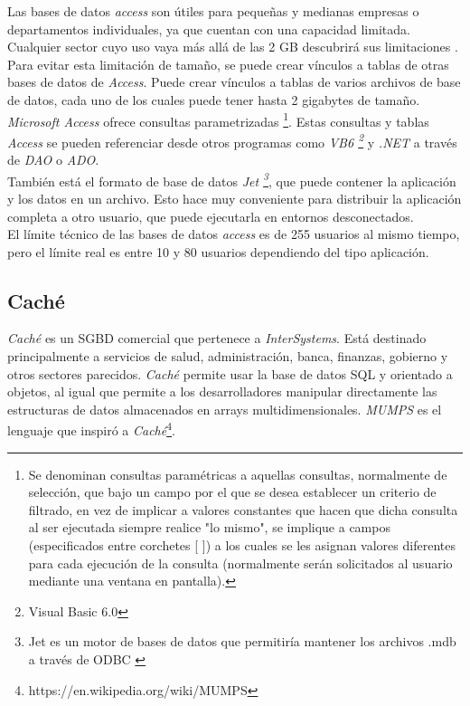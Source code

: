 \documentclass{article}
\begin{document}
Las bases de datos \emph{access} son útiles para pequeñas y medianas empresas o departamentos individuales, ya que cuentan con una capacidad limitada. Cualquier sector cuyo uso vaya más allá de las 2 GB descubrirá sus limitaciones \cite{ACC:4}. Para evitar esta limitación de tamaño, se puede crear vínculos a tablas de otras bases de datos de \emph{Access}. Puede crear vínculos a tablas de varios archivos de base de datos, cada uno de los cuales puede tener hasta 2 gigabytes de tamaño. \cite{ACC:5}\\

\emph{Microsoft Access} ofrece consultas parametrizadas \footnote{Se denominan consultas paramétricas a aquellas consultas, normalmente de selección, que bajo un campo por el que se desea establecer un criterio de filtrado, en vez de implicar a valores constantes que hacen que dicha consulta al ser ejecutada siempre realice "lo mismo", se implique a campos (especificados entre corchetes [ ]) a los cuales se les asignan valores diferentes para cada ejecución de la consulta (normalmente serán solicitados al usuario mediante una ventana en pantalla).\cite{ACC:7}}. Estas consultas y tablas \emph{Access} se pueden referenciar desde otros programas como \emph{VB6 \footnote{Visual Basic 6.0}} y \emph{.NET} a través de \emph{DAO} o \emph{ADO}. \cite{ACC:6}\\

También está el formato de base de datos \emph{Jet \footnote{Jet es un motor de bases de datos que permitiría mantener los archivos .mdb a través de ODBC \cite{ACC:8}}}, que puede contener la aplicación y los datos en un archivo. Esto hace muy conveniente para distribuir la aplicación completa a otro usuario, que puede ejecutarla en entornos desconectados. \cite{ACC:6}\\

El límite técnico de las bases de datos \emph{access} es de 255 usuarios al mismo tiempo, pero el límite real es entre 10 y 80 usuarios dependiendo del tipo aplicación. \cite{ACC:4}\\

\subsection{Caché}
\emph{Caché} es un SGBD comercial que pertenece a \emph{InterSystems}. Está destinado principalmente a servicios de salud, administración, banca, finanzas, gobierno y otros sectores parecidos. \emph{Caché} permite usar la base de datos SQL y orientado a objetos, al igual que permite a los desarrolladores manipular directamente las estructuras de datos almacenados en arrays multidimensionales. \emph{MUMPS} es el lenguaje que inspiró a \emph{Caché}\footnote{https://en.wikipedia.org/wiki/MUMPS}.\cite{wikiCache}\\
\end{document}
